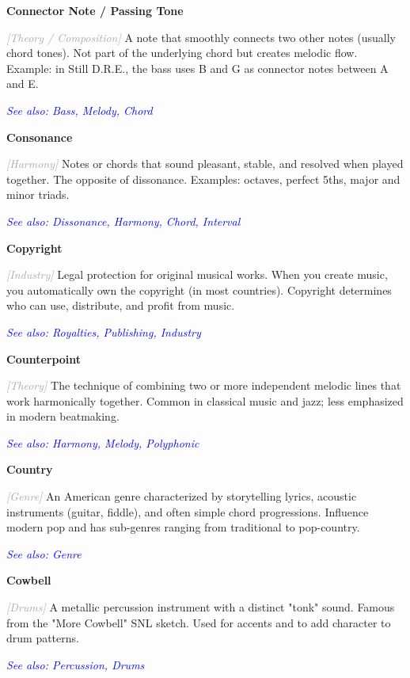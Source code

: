 \documentclass[11pt,letterpaper]{article}
\newcommand{\term}[1]{\textbf{\large\color{purple}#1}}
\newcommand{\category}[1]{\textcolor{darkgray}{\textit{\small [#1]}}}
\newcommand{\seealso}[1]{\textcolor{blue}{\textit{See also: #1}}}
\newenvironment{termdef}[1]
  {\noindent\term{#1}\par\nopagebreak}
  {\par\vspace{0.3em}}
\begin{document}
\begin{termdef}{Connector Note / Passing Tone}
\category{Theory / Composition}
A note that smoothly connects two other notes (usually chord tones). Not part of the underlying chord but creates melodic flow. Example: in Still D.R.E., the bass uses B and G as connector notes between A and E.

\seealso{Bass, Melody, Chord}
\end{termdef}

\begin{termdef}{Consonance}
\category{Harmony}
Notes or chords that sound pleasant, stable, and resolved when played together. The opposite of dissonance. Examples: octaves, perfect 5ths, major and minor triads.

\seealso{Dissonance, Harmony, Chord, Interval}
\end{termdef}

\begin{termdef}{Copyright}
\category{Industry}
Legal protection for original musical works. When you create music, you automatically own the copyright (in most countries). Copyright determines who can use, distribute, and profit from music.

\seealso{Royalties, Publishing, Industry}
\end{termdef}

\begin{termdef}{Counterpoint}
\category{Theory}
The technique of combining two or more independent melodic lines that work harmonically together. Common in classical music and jazz; less emphasized in modern beatmaking.

\seealso{Harmony, Melody, Polyphonic}
\end{termdef}

\begin{termdef}{Country}
\category{Genre}
An American genre characterized by storytelling lyrics, acoustic instruments (guitar, fiddle), and often simple chord progressions. Influence modern pop and has sub-genres ranging from traditional to pop-country.

\seealso{Genre}
\end{termdef}

\begin{termdef}{Cowbell}
\category{Drums}
A metallic percussion instrument with a distinct "tonk" sound. Famous from the "More Cowbell" SNL sketch. Used for accents and to add character to drum patterns.

\seealso{Percussion, Drums}
\end{termdef}
\end{document}
